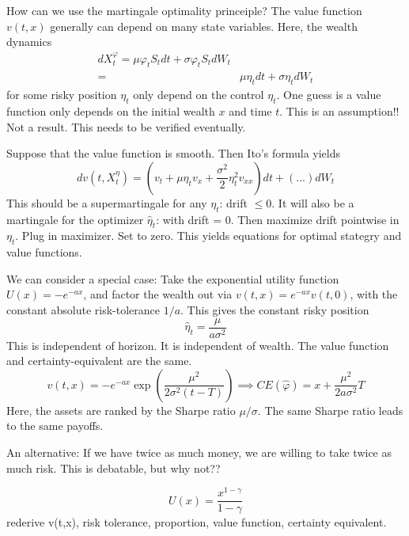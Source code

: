 How can we use the martingale optimality princeiple? The value function $v(t,x)$ generally can depend on many state variables. Here, the wealth dynamics
\begin{align}
	d X_t^\varphi = \mu \varphi_t S_t dt + \sigma \varphi_t S_t dW_t\\
			=& \mu \eta_t dt + \sigma \eta_t dW_t
\end{align}
for some risky position $\eta_t$ only depend on the control $\eta_t$. One guess is a value function only depends on the initial wealth $x$ and time $t$. This is an assumption!! Not a result. This needs to be verified eventually.

Suppose that the value function is smooth. Then Ito's formula yields
\begin{equation}
	dv(t, X^\eta_t) = (v_t + \mu \eta_t v_x + \frac{\sigma^2}{2}\eta^2_t v_{xx})dt + (...) dW_t
\end{equation}
This should be a supermartingale for any $\eta_t$: drift $\leq 0$. It will also be a martingale for the optimizer $\hat{\eta}_t$: with drift = 0. Then maximize drift pointwise in $\eta_t$. Plug in maximizer. Set to zero. This yields equations for optimal stategry and value functions.


We can consider a special case: Take the exponential utility function $U(x) = -e^{-ax}$, and factor the wealth out via $v(t,x) = e^{-ax}v(t,0)$, with the constant absolute risk-tolerance $1/a$. This gives the constant risky position
\begin{equation}
	\hat{\eta}_t = \frac{\mu}{a \sigma^2}
\end{equation}
This is independent of horizon. It is independent of wealth. The value function and certainty-equivalent are the same.
\begin{equation}
	v(t,x) = -e^{-ax} \exp(\frac{\mu^2}{2\sigma^2(t-T)}) \implies CE(\hat{\varphi}) = x + \frac{\mu^2}{2 a \sigma^2} T
\end{equation}
Here, the assets are ranked by the Sharpe ratio $\mu/\sigma$. The same Sharpe ratio leads to the same payoffs.


An alternative: If we have twice as much money, we are willing to take twice as much risk. This is debatable, but why not??

\begin{equation}
	U(x) = \frac{x^{1-\gamma}}{1-\gamma} 
\end{equation}
rederive v(t,x), risk tolerance, proportion, value function, certainty equivalent.



